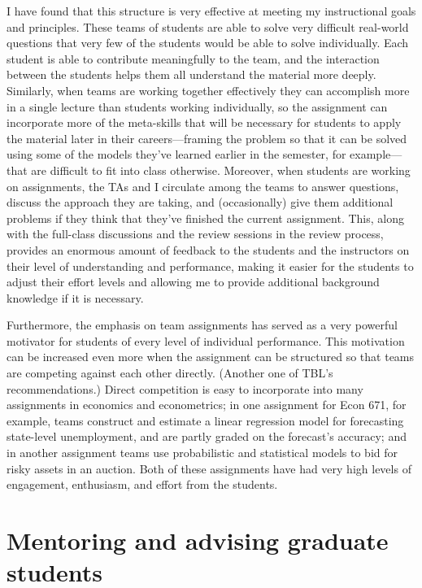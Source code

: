 \documentclass[12pt]{article}%
\begin{document}
I have found that this structure is very effective at meeting my
instructional goals and principles. These teams of students are able
to solve very difficult real-world questions that very few of the
students would be able to solve individually. Each student is able to
contribute meaningfully to the team, and the interaction between the
students helps them all understand the material more
deeply. Similarly, when teams are working together effectively they
can accomplish more in a single lecture than students working
individually, so the assignment can incorporate more of the
meta-skills that will be necessary for students to apply the material
later in their careers---framing the problem so that it can be solved
using some of the models they've learned earlier in the semester, for
example---that are difficult to fit into class otherwise. Moreover,
when students are working on assignments, the TAs and I circulate
among the teams to answer questions, discuss the approach they are
taking, and (occasionally) give them additional problems if they think
that they've finished the current assignment. This, along with the
full-class discussions and the review sessions in the review process,
provides an enormous amount of feedback to the students and the
instructors on their level of understanding and performance, making it
easier for the students to adjust their effort levels and allowing me
to provide additional background knowledge if it is necessary.

Furthermore, the emphasis on team assignments has served as a very
powerful motivator for students of every level of individual
performance. This motivation can be increased even more when the
assignment can be structured so that teams are competing against each
other directly. (Another one of TBL's recommendations.) Direct
competition is easy to incorporate into many assignments in economics
and econometrics; in one assignment for Econ 671, for example, teams
construct and estimate a linear regression model for forecasting
state-level unemployment, and are partly graded on the forecast's
accuracy; and in another assignment teams use probabilistic and
statistical models to bid for risky assets in an auction. Both of
these assignments have had very high levels of engagement, enthusiasm,
and effort from the students.

\section*{Mentoring and advising graduate students}
\end{document}
